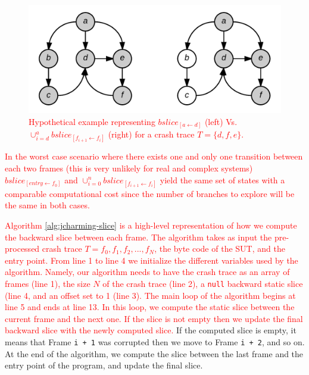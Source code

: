 \documentclass[times, doublespace]{smrauth}
\newcommand{\red}[1]{\textcolor{red}{#1}}
\begin{document}
{\begin{figure}
  \centering
    \includegraphics[scale=0.25]{media/jcharming-slices.png}
    \caption{\red{Hypothetical example representing $bslice_{[a \leftarrow d]}$ (left) Vs. $\cup_{i=d}^{a} bslice_{[f_{i+1} \leftarrow f_i]}$ (right) for a crash trace $T=\{d, f, e\}$.
    \label{fig:jcharming-slice}}}
\end{figure}

\red{In the worst case scenario where there exists one and only one
transition between each two frames (this is very unlikely for real
and complex systems) $bslice_{[entry \leftarrow f_0]}$ and
 $\cup_{i=0}^n bslice_{[f_{i+1} \leftarrow f_i]}$ yield the same set of states with a
comparable computational cost since the number of branches
to explore will be the same in both cases.}


\red{Algorithm \ref{alg:jcharming-slice} is a high-level
representation of how we compute the backward slice between
each frame.
The algorithm takes as input the pre-processed
crash trace $T={f_0, f_1, f_2, ..., f_N}$, the byte code of the SUT, and the entry point. From
line 1 to line 4 we initialize the different variables used by the
algorithm.
Namely, our algorithm needs to have the crash trace as an array of frames (line 1), the size $N$ of the crash trace (line 2), a \texttt{null} backward static slice (line 4, and an offset set to 1 (line 3).
The main loop of the algorithm begins at line 5 and
ends at line 13.
In this loop, we compute the static slice
between the current frame and the next one. If the slice is not empty then we update the final backward
slice with the newly computed slice.}
If the computed slice is empty, it means that Frame {\tt i + 1}
was corrupted then we move to Frame {\tt i + 2}, and so on.
At the end of the algorithm, we compute the slice between the
last frame and the entry point of the program, and update the
final slice.

}
\end{document}

